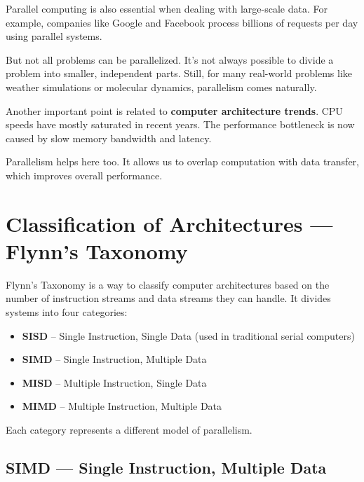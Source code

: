 \documentclass[12pt]{book}
\begin{document}
Parallel computing is also essential when dealing with large-scale data. For example, companies like Google and Facebook process billions of requests per day using parallel systems.

\vspace{0.3cm}

But not all problems can be parallelized. It’s not always possible to divide a problem into smaller, independent parts. Still, for many real-world problems like weather simulations or molecular dynamics, parallelism comes naturally.

\vspace{0.3cm}

Another important point is related to \textbf{computer architecture trends}. CPU speeds have mostly saturated in recent years. The performance bottleneck is now caused by slow memory bandwidth and latency.

Parallelism helps here too. It allows us to overlap computation with data transfer, which improves overall performance.





\section{Classification of Architectures — Flynn's Taxonomy}
\label{sec:flynn-taxonomy}

Flynn's Taxonomy is a way to classify computer architectures based on the number of instruction streams and data streams they can handle. It divides systems into four categories:

\begin{itemize}
    \item \textbf{SISD} – Single Instruction, Single Data (used in traditional serial computers)
    \item \textbf{SIMD} – Single Instruction, Multiple Data
    \item \textbf{MISD} – Multiple Instruction, Single Data
    \item \textbf{MIMD} – Multiple Instruction, Multiple Data
\end{itemize}

Each category represents a different model of parallelism.

\subsection{SIMD — Single Instruction, Multiple Data}
\label{subsec:simd}
\end{document}
